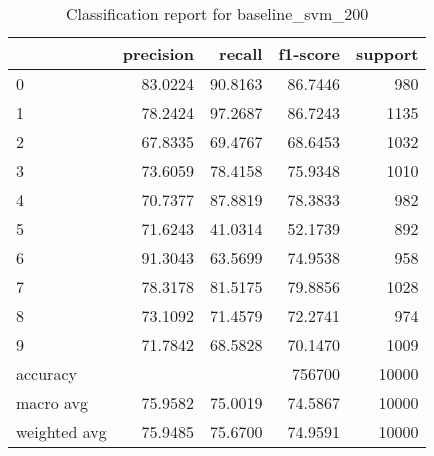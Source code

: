 \begin{table}[htb!]
\centering
\begin{tabular}{lrrrr}
    \toprule
 & precision & recall & f1-score & support \\
 \midrule
 0 & 83.0224 & 90.8163 & 86.7446 & 980 \\
 1 & 78.2424 & 97.2687 & 86.7243 & 1135 \\
 2 & 67.8335 & 69.4767 & 68.6453 & 1032 \\
 3 & 73.6059 & 78.4158 & 75.9348 & 1010 \\
 4 & 70.7377 & 87.8819 & 78.3833 & 982 \\
 5 & 71.6243 & 41.0314 & 52.1739 & 892 \\
 6 & 91.3043 & 63.5699 & 74.9538 & 958 \\
 7 & 78.3178 & 81.5175 & 79.8856 & 1028 \\
 8 & 73.1092 & 71.4579 & 72.2741 & 974 \\
 9 & 71.7842 & 68.5828 & 70.1470 & 1009 \\
 accuracy & & & 756700 & 10000 \\
 macro avg & 75.9582 & 75.0019 & 74.5867 & 10000 \\
 weighted avg & 75.9485 & 75.6700 & 74.9591 & 10000 \\
 \bottomrule
\end{tabular}
\caption{Classification report for baseline\_svm\_200}
\label{tab:classification-report-baseline_svm_200}
\end{table}
